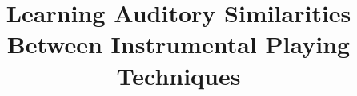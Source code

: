 \documentclass{bmcart}
\begin{document}
\begin{frontmatter}

\begin{fmbox}


\title{Learning Auditory Similarities Between Instrumental Playing Techniques}


\author[
   addressref={aff1},                   %
   corref={aff1},                       %
   noteref={n1},                        %
   email={email@example.com}            %
]{ }
\author[
   addressref={aff2},
   email={email@example.com}
]{ }
\author[
   addressref={aff2},
   email={email@example.com}
]{ }
\author[
   addressref={aff2},
   email={email@example.com}
]{ }
\author[
   addressref={ccm},
   email={janden@flatironinstitute.org}
]{ }
\author[
   addressref={aff2},
   email={email@example.com}
]{ }



\end{fmbox}
\end{frontmatter}
\end{document}
